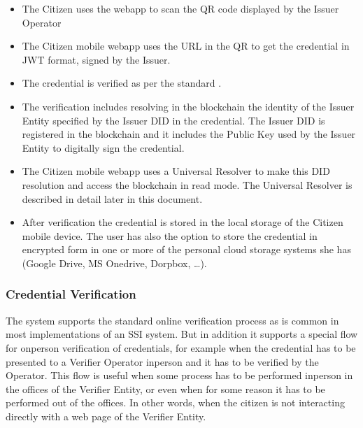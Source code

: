 \documentclass[a4paper,12pt,english]{sphinxhowto}
\begin{document}
\sphinxAtStartPar
{}
\begin{itemize}
\item {} 
\sphinxAtStartPar
The Citizen uses the webapp to scan the QR code displayed by the Issuer Operator

\item {} 
\sphinxAtStartPar
The Citizen mobile webapp uses the URL in the QR to get the credential in JWT format, signed by the Issuer.

\end{itemize}

\sphinxAtStartPar
{}
\begin{itemize}
\item {} 
\sphinxAtStartPar
The credential is verified as per the standard .

\item {} 
\sphinxAtStartPar
The verification includes resolving in the blockchain the identity of the Issuer Entity specified by the Issuer DID in the credential. The Issuer DID is registered in the blockchain and it includes the Public Key used by the Issuer Entity to digitally sign the credential.

\item {} 
\sphinxAtStartPar
The Citizen mobile webapp uses a Universal Resolver to make this DID resolution and access the blockchain in read mode. The Universal Resolver is described in detail later in this document.

\item {} 
\sphinxAtStartPar
After verification the credential is stored in the local storage of the Citizen mobile device. The user has also the option to store the credential in encrypted form in one or more of the personal cloud storage systems she has (Google Drive, MS Onedrive, Dorpbox, …).

\end{itemize}


\subsubsection{Credential Verification}
\label{\detokenize{ssi/privacycred:credential-verification}}
\sphinxAtStartPar
The system supports the standard online verification process as is common in most implementations of an SSI system. But in addition it supports a special flow for on\sphinxhyphen{}person verification of credentials, for example when the credential has to be presented to a Verifier Operator in\sphinxhyphen{}person and it has to be verified by the Operator.
This flow is useful when some process has to be performed in\sphinxhyphen{}person in the offices of the Verifier Entity, or even when for some reason it has to be performed out of the offices. In other words, when the citizen is not interacting directly with a web page of the Verifier Entity.
\end{document}
